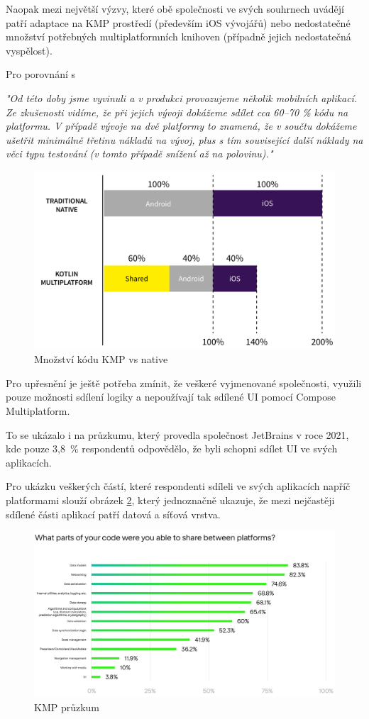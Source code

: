 Naopak mezi největší výzvy, které obě společnosti ve svých souhrnech uvádějí patří adaptace na KMP prostředí (především iOS vývojářů) nebo
nedostatečné množství potřebných multiplatformních knihoven (případně jejich nedostatečná vyspělost). \cite{KMPinForbes} \cite{KMPinMcDonalds}

Pro porovnání s 

\emph{"Od této doby jsme vyvinuli a v produkci provozujeme několik mobilních aplikací. Ze zkušenosti vidíme, že při jejich vývoji dokážeme 
sdílet cca 60–70 \% kódu na platformu. V případě vývoje na dvě platformy to znamená, že v součtu dokážeme ušetřit minimálně třetinu 
nákladů na vývoj, plus s tím související další náklady na věci typu testování (v tomto případě snížení až na polovinu)."}

\begin{figure}[H]
  \centering
  \includegraphics[width=.7\textwidth]{chart-KMP-vs-native.png}
  \caption{Množství kódu KMP vs native}
  \label{fig:KMP_vs_native}
\end{figure}

Pro upřesnění je ještě potřeba zmínit, že veškeré vyjmenované společnosti, využili pouze možnosti sdílení logiky a nepoužívají
tak sdílené UI pomocí Compose Multiplatform.

To se ukázalo i na průzkumu, který provedla společnost JetBrains v roce 2021, kde pouze 3,8~\% respondentů odpovědělo, že byli schopni sdílet UI ve svých aplikacích.

Pro ukázku veškerých částí, které respondenti sdíleli ve svých aplikacích napříč platformami slouží obrázek \ref{fig:KMPSurvey}, který jednoznačně ukazuje, že
mezi nejčastěji sdílené části aplikací patří datová a síťová vrstva.  

\begin{figure}[H]
  \centering
  \includegraphics[width=1\textwidth]{survey-results-q1-q2-22-light.png}
  \caption{KMP průzkum}
  \label{fig:KMPSurvey}
\end{figure}

